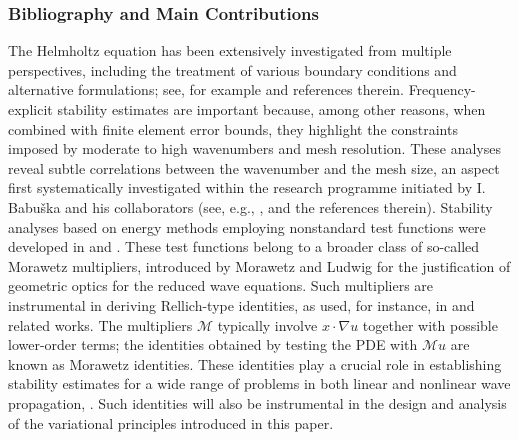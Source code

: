 \documentclass[twoside,11pt]{article}
\begin{document}
\subsubsection*{Bibliography and Main Contributions}
The Helmholtz equation has been extensively investigated from multiple perspectives, including the treatment of various boundary conditions and alternative formulations; see, for example
\cite{MorawetzLudwig1968, 
FixMarin1978,
Goldstein1982,
BGT1985,
Aziz_et_al_1988,
KellerGivoli1989,
Givoli1992,
Douglas_et_al_1993,
perthame1999morrey,
Yafaev2000,
SingerTurkel2004,
CummingsFeng2006,
Mitsoudis2007,
Athanassoulis_et_al_2008,
chandler2008wave,
MitsoudisPlexousakis2009,
MMP2012,
SauterTorres2018,
GROTE_control_H_2019,
GrahamSauter2020}
{and references therein}.
Frequency-explicit stability estimates are important because, among other reasons, when combined with finite element error bounds, they highlight the constraints imposed by moderate to high {wavenumbers} and {mesh resolution}. These analyses reveal subtle correlations between the wavenumber and the mesh size, an aspect first systematically investigated within the research {programme} initiated by I. Babu\v ska and his collaborators (see, e.g., \cite{IhlenburgBabuska1995, Ihlenburg1998, BabuskaSauter2000}, and the references therein).
Stability analyses based on energy methods employing nonstandard test functions were developed in {\cite{Makridakis_et_al_1996} and \cite{Melenk1995}}. 
These test functions belong to a broader class of so-called Morawetz multipliers, introduced by Morawetz and Ludwig \cite{MorawetzLudwig1968} for the justification of geometric optics for the reduced wave equations. Such multipliers are instrumental in deriving Rellich-type identities, as used, for instance, in \cite{CummingsFeng2006, Spence_Chandler-Wilde_integral_2011, Moiola_Spence2014} and related works.
{The multipliers $\mathcal{M}$ typically involve $x\cdot\nabla u$ together with possible lower-order terms; the identities obtained by testing the PDE with $\mathcal{M}u$ are known as Morawetz identities.}
These identities play a crucial role in establishing stability estimates for a wide range of problems in both linear and nonlinear wave propagation, \cite{Morawetz_PIrish_1972,
Lesky2003,
MetcalfeEtal2005,
Tao_2006,
DAncona_2012,
Hintz_Zworski_2017,
Tao_MI_notices,
cossetti2024virial,
Bigniardi_Moiola_wave_2025}.
Such identities will also be instrumental in the design and analysis of the variational principles introduced in this paper. 
\end{document}
